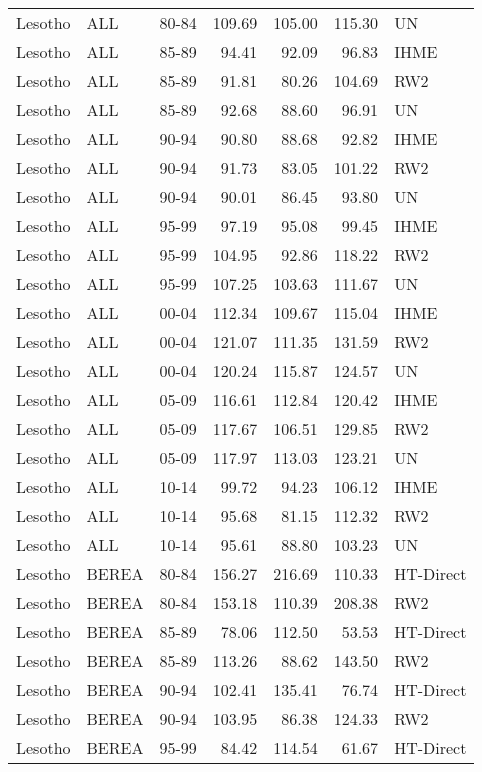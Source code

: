 \begin{longtable}{lllrrrl}
  Lesotho & ALL & 80-84 & 109.69 & 105.00 & 115.30 & UN \\ 
  Lesotho & ALL & 85-89 & 94.41 & 92.09 & 96.83 & IHME \\ 
  Lesotho & ALL & 85-89 & 91.81 & 80.26 & 104.69 & RW2 \\ 
  Lesotho & ALL & 85-89 & 92.68 & 88.60 & 96.91 & UN \\ 
  Lesotho & ALL & 90-94 & 90.80 & 88.68 & 92.82 & IHME \\ 
  Lesotho & ALL & 90-94 & 91.73 & 83.05 & 101.22 & RW2 \\ 
  Lesotho & ALL & 90-94 & 90.01 & 86.45 & 93.80 & UN \\ 
  Lesotho & ALL & 95-99 & 97.19 & 95.08 & 99.45 & IHME \\ 
  Lesotho & ALL & 95-99 & 104.95 & 92.86 & 118.22 & RW2 \\ 
  Lesotho & ALL & 95-99 & 107.25 & 103.63 & 111.67 & UN \\ 
  Lesotho & ALL & 00-04 & 112.34 & 109.67 & 115.04 & IHME \\ 
  Lesotho & ALL & 00-04 & 121.07 & 111.35 & 131.59 & RW2 \\ 
  Lesotho & ALL & 00-04 & 120.24 & 115.87 & 124.57 & UN \\ 
  Lesotho & ALL & 05-09 & 116.61 & 112.84 & 120.42 & IHME \\ 
  Lesotho & ALL & 05-09 & 117.67 & 106.51 & 129.85 & RW2 \\ 
  Lesotho & ALL & 05-09 & 117.97 & 113.03 & 123.21 & UN \\ 
  Lesotho & ALL & 10-14 & 99.72 & 94.23 & 106.12 & IHME \\ 
  Lesotho & ALL & 10-14 & 95.68 & 81.15 & 112.32 & RW2 \\ 
  Lesotho & ALL & 10-14 & 95.61 & 88.80 & 103.23 & UN \\ 
  Lesotho & BEREA & 80-84 & 156.27 & 216.69 & 110.33 & HT-Direct \\ 
  Lesotho & BEREA & 80-84 & 153.18 & 110.39 & 208.38 & RW2 \\ 
  Lesotho & BEREA & 85-89 & 78.06 & 112.50 & 53.53 & HT-Direct \\ 
  Lesotho & BEREA & 85-89 & 113.26 & 88.62 & 143.50 & RW2 \\ 
  Lesotho & BEREA & 90-94 & 102.41 & 135.41 & 76.74 & HT-Direct \\ 
  Lesotho & BEREA & 90-94 & 103.95 & 86.38 & 124.33 & RW2 \\ 
  Lesotho & BEREA & 95-99 & 84.42 & 114.54 & 61.67 & HT-Direct \\ 

\end{longtable}

